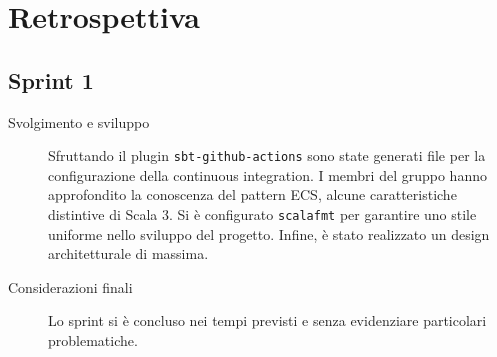 \chapter{Retrospettiva}\label{ch:retrospettiva}
\section{Sprint 1}
\begin{description}
    \item [Svolgimento e sviluppo] Sfruttando il plugin \texttt{sbt-github-actions} sono state generati file per la configurazione della continuous integration.
    I membri del gruppo hanno approfondito la conoscenza del pattern ECS, alcune caratteristiche distintive di Scala 3.
    Si è configurato \texttt{scalafmt} per garantire uno stile uniforme nello sviluppo del progetto.
    Infine, è stato realizzato un design architetturale di massima.
    \item [Considerazioni finali] Lo sprint si è concluso nei tempi previsti e senza evidenziare particolari problematiche.
\end{description}
